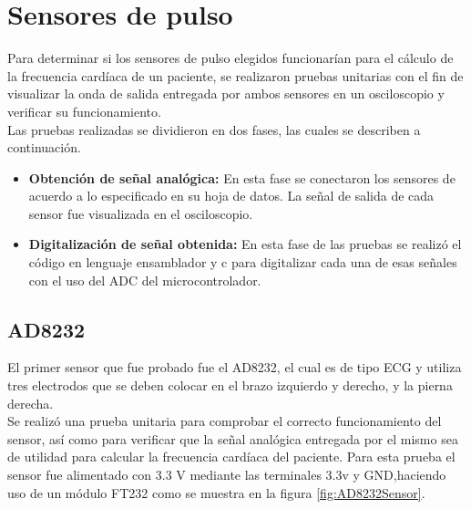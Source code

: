 
\section{Sensores de pulso}
Para determinar si los sensores de pulso elegidos funcionarían para el cálculo de la frecuencia cardíaca de un paciente, se realizaron pruebas unitarias con el fin de  visualizar la onda de salida entregada por ambos sensores en un osciloscopio y verificar su funcionamiento.\\

Las pruebas realizadas se dividieron en dos fases, las cuales se describen a continuación.

\begin{itemize}
	\item \textbf{Obtención de señal analógica:} En esta fase se conectaron los sensores de acuerdo a lo especificado en su hoja de datos. La señal de salida de cada sensor fue visualizada en el osciloscopio.
	\item \textbf{Digitalización de señal obtenida:} En esta fase de las pruebas se realizó el código en lenguaje ensamblador y c para digitalizar cada una de esas señales con el uso del ADC del microcontrolador.
\end{itemize}

\subsection{AD8232}
El primer sensor que fue probado fue el AD8232, el cual es de tipo ECG y utiliza tres electrodos que se deben colocar en el brazo izquierdo y derecho, y la pierna derecha.\\

Se realizó una prueba unitaria para comprobar el correcto funcionamiento del sensor, así como para verificar que la señal analógica entregada por el mismo sea de utilidad para calcular la frecuencia cardíaca del paciente. Para esta prueba el sensor fue alimentado con 3.3 V mediante las terminales 3.3v y GND,haciendo uso de un módulo FT232 como se muestra en la figura \ref{fig:AD8232Sensor}.\\

